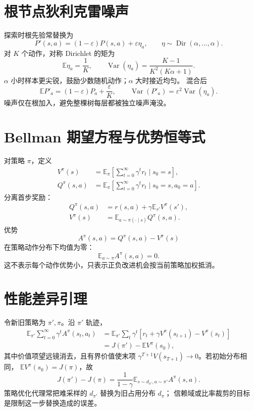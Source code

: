 \documentclass[11pt]{article}
\numberwithin{equation}{section}
\newcommand{\E}{\mathbb{E}}
\newcommand{\1}{\mathbf{1}}
\newcommand{\Var}{\operatorname{Var}}
\begin{document}
\section{根节点狄利克雷噪声}

探索时根先验常替换为
\begin{equation}
 P'(s,a)=(1-\varepsilon)P(s,a)+\varepsilon\eta_a,
 \qquad \eta\sim\operatorname{Dir}(\alpha,\ldots,\alpha).
\end{equation}
对 $K$ 个动作，对称 Dirichlet 的矩为
\begin{equation}
 \E\eta_a=\frac1K,\qquad
 \Var(\eta_a)=\frac{K-1}{K^2(K\alpha+1)}.
\end{equation}
$\alpha$ 小时样本更尖锐，鼓励少数随机动作；$\alpha$ 大时接近均匀。
混合后
\begin{equation}
 \E P'_a=(1-\varepsilon)P_a+\frac\varepsilon K,
 \qquad
 \Var(P'_a)=\varepsilon^2\Var(\eta_a).
\end{equation}
噪声仅在根加入，避免整棵树每层都被独立噪声淹没。

\section{Bellman 期望方程与优势恒等式}

对策略 $\pi$，定义
\begin{align}
 V^\pi(s)&=\E_\pi\left[\sum_{t=0}^{\infty}\gamma^tr_t\mid s_0=s\right],\\
 Q^\pi(s,a)&=\E_\pi\left[\sum_{t=0}^{\infty}\gamma^tr_t
 \mid s_0=s,a_0=a\right].
\end{align}
分离首步奖励：
\begin{align}
 Q^\pi(s,a)&=r(s,a)+\gamma\E_{s'}V^\pi(s'),\\
 V^\pi(s)&=\E_{a\sim\pi(\cdot\mid s)}Q^\pi(s,a).
\end{align}
优势
\begin{equation}
 A^\pi(s,a)=Q^\pi(s,a)-V^\pi(s)
\end{equation}
在策略动作分布下均值为零：
\begin{equation}
 \E_{a\sim\pi}A^\pi(s,a)=0.
\end{equation}
这不表示每个动作优势小，只表示正负改进机会按当前策略加权抵消。

\section{性能差异引理}

令新旧策略为 $\pi',\pi$。沿 $\pi'$ 轨迹，
\begin{align}
 \E_{\pi'}\sum_{t=0}^{\infty}\gamma^tA^\pi(s_t,a_t)
 &=\E_{\pi'}\sum_t\gamma^t
 [r_t+\gamma V^\pi(s_{t+1})-V^\pi(s_t)]\\
 &=J(\pi')-\E V^\pi(s_0),
\end{align}
其中价值项望远镜消去，且有界价值使末项
$\gamma^{T+1}V(s_{T+1})\to0$。若初始分布相同，
$\E V^\pi(s_0)=J(\pi)$，故
\begin{equation}
 \boxed{J(\pi')-J(\pi)
 =\frac1{1-\gamma}
 \E_{s\sim d_{\pi'},a\sim\pi'}A^\pi(s,a).}
\end{equation}
策略优化代理常把难采样的 $d_{\pi'}$ 替换为旧占用分布 $d_\pi$；
信赖域或比率裁剪的目标是限制这一步替换造成的误差。
\end{document}
